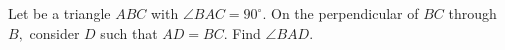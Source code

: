 Let be a triangle $ ABC $ with $ \angle BAC = 90^{\circ } . $ On the perpendicular of $ BC $ through $ B, $ consider $ D $ such that $ AD=BC. $ Find $ \angle BAD. $